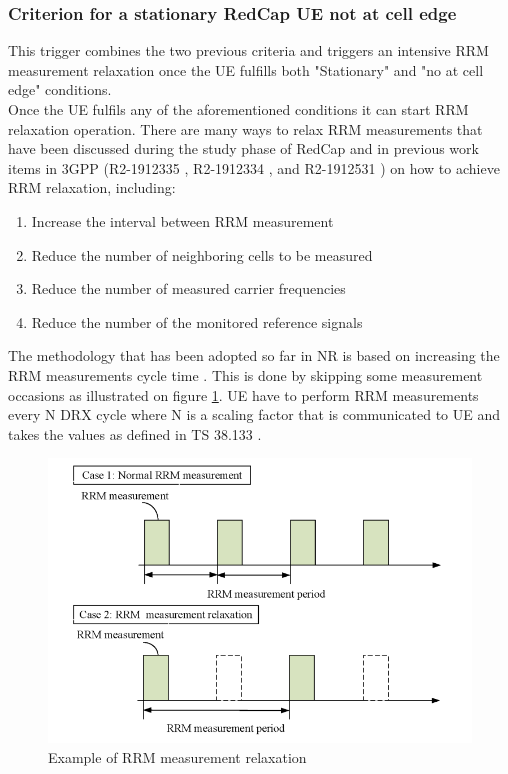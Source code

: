 \documentclass[conference]{IEEEtran}
\begin{document}
\subsubsection*{\textbf{Criterion for a stationary RedCap UE not at cell edge}} This trigger combines the two previous criteria and triggers an intensive RRM measurement relaxation once the UE fulfills both "Stationary" and "no at cell edge" conditions. \\



Once the UE fulfils any of the aforementioned conditions it can start RRM relaxation operation. There are many ways to relax RRM measurements that have been discussed during the study phase of RedCap and in previous work items in 3GPP (R2-1912335 \cite{3gpp_ue_2019_R2-1912335}, R2-1912334 \cite{3gpp_rrm_2019_R2-1912334}, and R2-1912531 \cite{1912531_R2-1912531}) on how to achieve RRM relaxation, including:
\begin{enumerate}
    \item Increase the interval between RRM measurement
    \item Reduce the number of neighboring cells to be measured
    \item Reduce the number of measured carrier frequencies
    \item Reduce the number of the monitored reference signals
\end{enumerate}
The methodology that has been adopted so far in NR is based on increasing the RRM measurements cycle time\cite{3gpp_nr_2022-10_38.304} .  This is done by skipping some measurement occasions as illustrated on figure \ref{fig:rrm-relaxation}. UE have to perform RRM measurements every N DRX cycle where N is a scaling factor that is communicated to UE and takes the values as defined in TS 38.133 \cite{3gpp_nr_2022-11_38.133}.

\begin{figure}
    \centering
    \includegraphics[width=\linewidth]{Pictures/RRM measurement relaxation.png}
    \caption{Example of RRM measurement relaxation}
    \label{fig:rrm-relaxation}
\end{figure}
\end{document}
